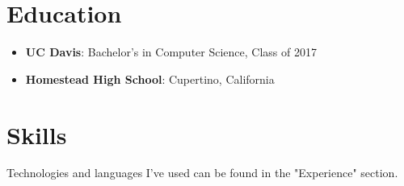 \documentclass[letterpaper,11pt]{article}
\newcommand{\resumeItem}[2]{
  \item\small{
    \textbf{#1}{: #2 \vspace{-2.5pt}}
  }
}
\newcommand{\resumeSubItem}[2]{\resumeItem{#1}{#2}\vspace{-4.5pt}}
\newcommand{\resumeSubHeadingListStart}{\begin{itemize}[leftmargin=*]}
\newcommand{\resumeSubHeadingListEnd}{\end{itemize}}
\begin{document}
\section{Education}
  \resumeSubHeadingListStart
    \resumeSubItem
      {UC Davis}{Bachelor's in Computer Science, Class of 2017}
    \resumeSubItem
      {Homestead High School}{Cupertino, California}
  \resumeSubHeadingListEnd

  
\section{Skills}
  Technologies and languages I've used can be found in the "Experience" section.
\end{document}
